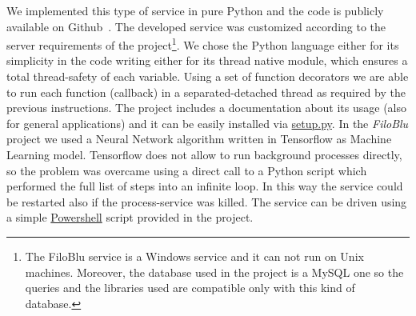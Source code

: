 \documentclass{standalone}
\begin{document}
We implemented this type of service in pure \textsf{Python} and the code is publicly available on Github~\cite{FiloBlu}.
The developed service was customized according to the server requirements of the project\footnote{
  The FiloBlu service is a Windows service and it can not run on Unix machines.
  Moreover, the database used in the project is a \textsf{MySQL} one so the queries and the libraries used are compatible only with this kind of database.
}.
We chose the \textsf{Python} language either for its simplicity in the code writing either for its thread native module, which ensures a total thread-safety of each variable.
Using a set of function decorators we are able to run each function (\textsf{callback}) in a separated-detached thread as required by the previous instructions.
The project includes a documentation about its usage (also for general applications) and it can be easily installed via \href{https://github.com/Nico-Curti/FiloBluService/blob/master/setup.py}{\textsf{setup.py}}.
In the \emph{FiloBlu} project we used a Neural Network algorithm written in \textsf{Tensorflow} as Machine Learning model.
\textsf{Tensorflow} does not allow to run background processes directly, so the problem was overcame using a direct call to a \textsf{Python} script which performed the full list of steps into an infinite loop.
In this way the service could be restarted also if the process-service was killed.
The service can be driven using a simple \href{https://github.com/Nico-Curti/FiloBluService/blob/master/filobluservice.ps1}{\textsf{Powershell}} script provided in the project.
\end{document}

